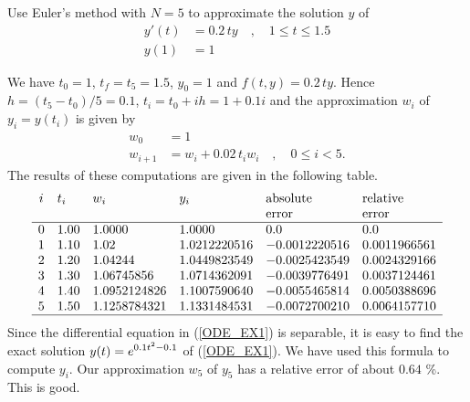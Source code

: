 \begin{egg}
Use Euler's method with $N=5$ to approximate the solution $y$ of
\begin{equation}\label{ODE_EX1}
\begin{split}
y'(t) & =  0.2\,ty \quad, \quad 1 \leq t \leq 1.5 \\
y(1) & =  1
\end{split}
\end{equation}

We have $t_0=1$, $t_f= t_5 =1.5$, $y_0 = 1$ and $f(t,y) = 0.2\,ty$.
Hence $h = (t_5-t_0)/5 = 0.1$, $t_i = t_0 + ih =1 + 0.1i$ and
the approximation $w_i$ of $y_i = y(t_i)$ is given by
\begin{align*}
w_0 & = 1 \\
w_{i+1} & = w_i + 0.02\,t_i w_i \quad, \quad 0 \leq i < 5 .
\end{align*}
The results of these computations are given in the following table.
\[
\begin{array}{clllll}
i & t_i & w_i & y_i & \text{absolute} & \text{relative} \\
  & & & & \text{error} & \text{error} \\
\hline
0 & 1.00 & 1.0000 & 1.0000 & 0.0 & 0.0 \\
1 & 1.10 & 1.02 & 1.0212220516 & -0.0012220516 & 0.0011966561 \\
2 & 1.20 & 1.04244 & 1.0449823549 & -0.0025423549 & 0.0024329166 \\
3 & 1.30 & 1.06745856 & 1.0714362091 & -0.0039776491 & 0.0037124461 \\
4 & 1.40 & 1.0952124826 & 1.1007590640 & -0.0055465814 & 0.0050388696 \\
5 & 1.50 & 1.1258784321 & 1.1331484531 & -0.0072700210 & 0.0064157710 \\
\hline
\end{array}
\]
Since the differential equation in (\ref{ODE_EX1}) is separable, it is
easy to find the exact solution $\displaystyle y(t) = e^{0.1t^2 -0.1}$ of
(\ref{ODE_EX1}).  We have used this formula to compute $y_i$.
Our approximation $w_5$ of $y_5$ has a relative error of about $0.64$
\%.  This is good.
\end{egg}

